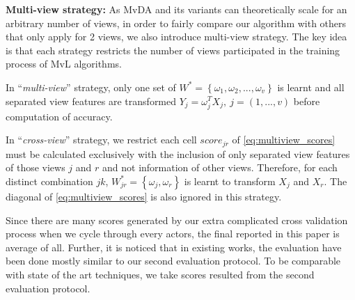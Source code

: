     \textbf{Multi-view strategy:} As MvDA and its variants can theoretically scale for an arbitrary number of views, in order to fairly compare our algorithm with others that only apply for 2 views, we also introduce multi-view strategy. The key idea is that each strategy restricts the number of views participated in the training process of MvL algorithms.

    In ``\emph{multi-view}'' strategy, only one set of $W^*=\left\{{\omega}_1, {\omega}_2, ..., {\omega}_v\right\}$ is learnt and all separated view features are transformed $Y_j=\omega_j^TX_j,\ j=(1,...,v)$ before computation of accuracy.

    In ``\emph{cross-view}'' strategy, we restrict each cell ${score}_{jr}$ of \eqref{eq:multiview_scores} must be calculated exclusively with the inclusion of only separated view features of those views $j$ and $r$ and not information of other views. Therefore, for each distinct combination $jk$, $W_{jr}^*=\left\{{\omega}_j, {\omega}_r\right\}$ is learnt to transform $X_j$ and $X_r$. The diagonal of \eqref{eq:multiview_scores} is also ignored in this strategy.

    Since there are many scores generated by our extra complicated cross validation process when we cycle through every actors, the final reported in this paper is average of all. Further, it is noticed that in existing works, the evaluation have been done mostly similar to our second evaluation protocol. To be comparable with state of the art techniques, we take scores resulted from the second evaluation protocol.
